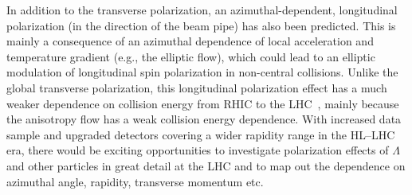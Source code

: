 In addition to the transverse polarization, an azimuthal-dependent, 
  longitudinal polarization (in the direction of the beam pipe) has 
  also been predicted. 
This is mainly a consequence of an azimuthal dependence of local acceleration 
  and temperature gradient (e.g., the elliptic flow), which could lead to an 
  elliptic modulation of longitudinal spin polarization in 
  non-central collisions. 
Unlike the global transverse polarization, this longitudinal polarization 
  effect has a much weaker dependence on collision energy from RHIC to 
  the LHC~\cite{Karpenko:2017dui}, mainly because the anisotropy flow has a 
  weak collision energy dependence. 
With increased data sample and upgraded detectors covering a wider rapidity 
  range in the HL--LHC era, there would be exciting opportunities to 
  investigate polarization effects of $\Lambda$ and other particles in great 
  detail at the LHC and to map out the dependence on azimuthal angle, 
  rapidity, transverse momentum etc.




